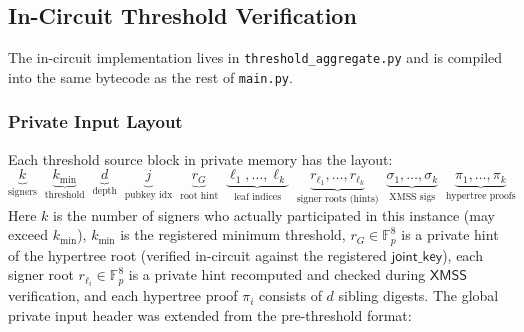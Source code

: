 \documentclass[11pt,a4paper]{article}
\newcommand{\KB}{\mathbb{F}_{p}}  %
\newcommand{\XMSS}{\textsf{XMSS}\xspace}
\begin{document}
\subsection{In-Circuit Threshold Verification}

The in-circuit implementation lives in \texttt{threshold\_aggregate.py} and is compiled into the same bytecode as the rest of \texttt{main.py}.

\subsubsection{Private Input Layout}

Each threshold source block in private memory has the layout:
\[
  \underbrace{k}_{\text{signers}}\;\;
  \underbrace{k_{\min}}_{\text{threshold}}\;\;
  \underbrace{d}_{\text{depth}}\;\;
  \underbrace{j}_{\text{pubkey idx}}\;\;
  \underbrace{r_G}_{\text{root hint}}\;\;
  \underbrace{\ell_1, \ldots, \ell_k}_{\text{leaf indices}}\;\;
  \underbrace{r_{\ell_1}, \ldots, r_{\ell_k}}_{\text{signer roots (hints)}}\;\;
  \underbrace{\sigma_1, \ldots, \sigma_k}_{\text{XMSS sigs}}\;\;
  \underbrace{\pi_1, \ldots, \pi_k}_{\text{hypertree proofs}}
\]
Here $k$ is the number of signers who actually participated in this instance (may exceed $k_{\min}$), $k_{\min}$ is the registered minimum threshold, $r_G \in \KB^8$ is a private hint of the hypertree root (verified in-circuit against the registered $\mathsf{joint\_key}$), each signer root $r_{\ell_i} \in \KB^8$ is a private hint recomputed and checked during $\XMSS$ verification, and each hypertree proof $\pi_i$ consists of $d$ sibling digests.
The global private input header was extended from the pre-threshold format:
\begin{center}
\end{center}
\end{document}
